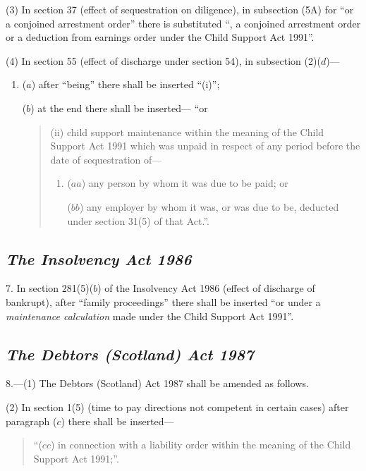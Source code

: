 \documentclass[12pt,a4paper]{article}
\begin{document}
(3) In section 37 (effect of sequestration on diligence), in subsection (5A)  for “or a conjoined arrestment order” there is substituted “, a conjoined arrestment order or a deduction from earnings order under the Child Support Act 1991”.

(4) In section 55 (effect of discharge under section 54), in subsection (2)($d$)—
\begin{enumerate}\item[]
($a$) after “being” there shall be inserted “(i)”;

($b$) at the end there shall be inserted— “or
\begin{quotation}
(ii) child support maintenance within the meaning of the Child Support Act 1991 which was unpaid in respect of any period before the date of sequestration of—
\begin{enumerate}\item[]
($aa$) any person by whom it was due to be paid; or

($bb$) any employer by whom it was, or was due to be, deducted under section 31(5)  of that Act.”.
\end{enumerate}
\end{quotation}
\end{enumerate}

\subsection*{\itshape The Insolvency Act 1986}

7. In section 281(5)($b$)  of the Insolvency Act 1986 (effect of discharge of bankrupt), after “family proceedings” there shall be inserted “or under a 
\emph{maintenance calculation}  %
made under the Child Support Act 1991”.

\subsection*{\itshape The Debtors (Scotland) Act 1987}

8.---(1) The Debtors (Scotland) Act 1987 shall be amended as follows.

(2) In section 1(5)  (time to pay directions not competent in certain cases) after paragraph ($c$)  there shall be inserted—
\begin{quotation}
“($cc$) in connection with a liability order within the meaning of the Child Support Act 1991;”.
\end{quotation}
\end{document}
